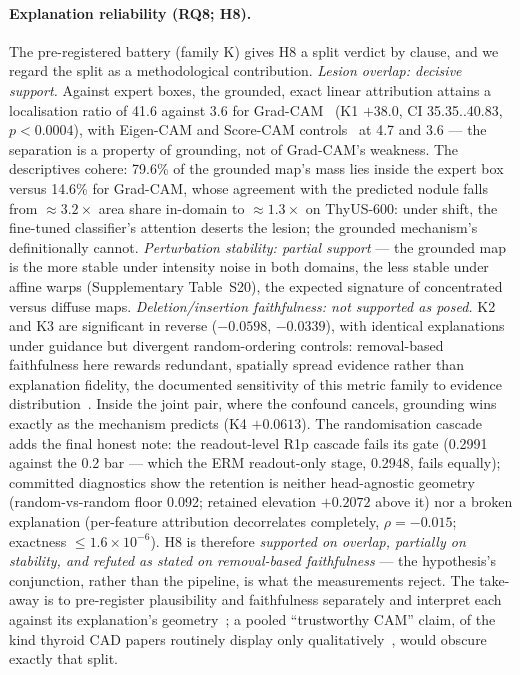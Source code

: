 \documentclass[jimh,article,submit,moreauthors,pdftex]{Definitions/tsp}
\begin{document}
\paragraph{Explanation reliability (RQ8; H8).}
The pre-registered battery (family K) gives H8 a split verdict by clause,
and we regard the split as a methodological contribution.
\emph{Lesion overlap: decisive support.} Against expert boxes, the
grounded, exact linear attribution attains a localisation ratio of 41.6
against 3.6 for Grad-CAM~\cite{rev_selvaraju2017} (K1 $+38.0$, CI
35.35..40.83, $p{<}0.0004$), with Eigen-CAM and Score-CAM
controls~\cite{rev_muhammad2020eigencam,rev_wang2020scorecam} at 4.7 and
3.6 --- the separation is a property of grounding, not of Grad-CAM's
weakness. The descriptives cohere: 79.6\% of the grounded map's mass lies
inside the expert box versus 14.6\% for Grad-CAM, whose agreement with the
predicted nodule falls from ${\approx}3.2\times$ area share in-domain to
${\approx}1.3\times$ on ThyUS-600: under shift, the fine-tuned
classifier's attention deserts the lesion; the grounded mechanism's
definitionally cannot. \emph{Perturbation stability: partial support} ---
the grounded map is the more stable under intensity noise in both domains,
the less stable under affine warps (Supplementary Table~S20), the
expected signature of concentrated versus diffuse maps.
\emph{Deletion/insertion faithfulness: not supported as posed.} K2 and K3
are significant in reverse ($-0.0598$, $-0.0339$), with identical
explanations under guidance but divergent random-ordering controls:
removal-based faithfulness here rewards redundant, spatially spread
evidence rather than explanation fidelity, the documented sensitivity of
this metric family to evidence
distribution~\cite{rev_samek2017,rev_hooker2019,rev_petsiuk2018rise}.
Inside the joint pair, where the confound cancels, grounding wins exactly
as the mechanism predicts (K4 $+0.0613$). The randomisation cascade adds
the final honest note: the readout-level R1p cascade fails its gate
(0.2991 against the 0.2 bar --- which the ERM readout-only stage, 0.2948,
fails equally); committed diagnostics show the retention is neither
head-agnostic geometry (random-vs-random floor 0.092; retained elevation
$+0.2072$ above it) nor a broken explanation (per-feature attribution
decorrelates completely, $\rho=-0.015$; exactness
${\le}1.6{\times}10^{-6}$). H8 is therefore
\emph{supported on overlap, partially on stability, and refuted as stated
on removal-based faithfulness} --- the hypothesis's conjunction, rather
than the pipeline, is what the measurements reject. The take-away is to
pre-register plausibility and faithfulness separately and interpret each
against its explanation's geometry~\cite{rev_adebayo2018}; a pooled
``trustworthy CAM'' claim, of the kind thyroid CAD papers routinely
display only
qualitatively~\cite{rev_yao2023tinet,rev_song2023explainer,rev_nguyen2023trust,rev_ahmed2026xai},
would obscure exactly that split.
\end{document}
